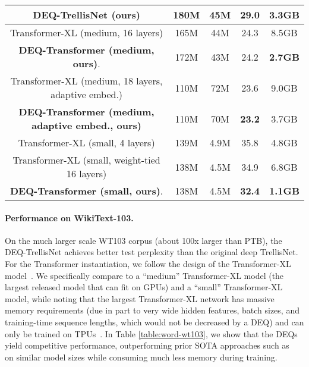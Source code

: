 \documentclass{article}
\begin{document}
\begin{table*}[t]
{\begin{tabular}{ccccc}
\textbf{DEQ-TrellisNet (ours)}                & 180M & 45M & \textbf{29.0} & \textbf{3.3GB} \\
\midrule
Transformer-XL (medium, 16 layers)   & 165M & 44M  & 24.3 & 8.5GB \\
\textbf{DEQ-Transformer (medium, ours)}.             & 172M & 43M & 24.2 & \textbf{2.7GB} \\
Transformer-XL (medium, 18 layers, adaptive embed.)        & 110M & 72M  & 23.6 & 9.0GB \\
\textbf{DEQ-Transformer (medium, adaptive embed., ours)}   & 110M & 70M & \textbf{23.2} & 3.7GB \\
\midrule
Transformer-XL (small, 4 layers)                & 139M & 4.9M & 35.8 & 4.8GB \\
Transformer-XL (small, weight-tied 16 layers)           & 138M & 4.5M & 34.9 & 6.8GB \\
\textbf{DEQ-Transformer (small, ours)}.    & 138M & 4.5M & \textbf{32.4} & \textbf{1.1GB} \\
\bottomrule
\end{tabular}}
\end{table*}

\vspace{-2mm}
\paragraph{Performance on WikiText-103.} On the much larger scale WT103 corpus (about 100x larger than PTB), the DEQ-TrellisNet achieves better test perplexity than the original deep TrellisNet. For the Transformer instantiation, we follow the design of the Transformer-XL model~\citep{dai2018transformer}. We specifically compare to a ``medium'' Transformer-XL model (the largest released model that can fit on GPUs) and a ``small'' Transformer-XL model, while noting that the largest Transformer-XL network has massive memory requirements (due in part to very wide hidden features, batch sizes, and training-time sequence lengths, which would not be decreased by a DEQ) and can only be trained on TPUs~\citep{dai2018transformer}. In Table \ref{table:word-wt103}, we show that the DEQs yield competitive performance, outperforming prior SOTA approaches such as~\citep{dai2018transformer} on similar model sizes while consuming much less memory during training.

\vspace{-2mm}
\end{document}
